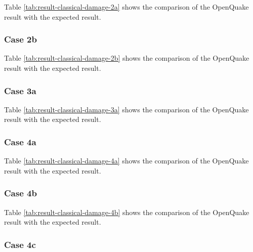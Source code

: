 

Table \ref{tab:result-classical-damage-2a} shows the comparison of the OpenQuake result with the expected result.

\subsubsection{Case 2b}




Table \ref{tab:result-classical-damage-2b} shows the comparison of the OpenQuake result with the expected result.

\subsubsection{Case 3a}




Table \ref{tab:result-classical-damage-3a} shows the comparison of the OpenQuake result with the expected result.

\subsubsection{Case 4a}




Table \ref{tab:result-classical-damage-4a} shows the comparison of the OpenQuake result with the expected result.

\subsubsection{Case 4b}




Table \ref{tab:result-classical-damage-4b} shows the comparison of the OpenQuake result with the expected result.

\subsubsection{Case 4c}


